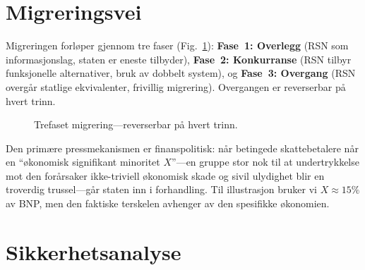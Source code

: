 \documentclass[11pt,a4paper,twocolumn]{article}
\begin{document}
\section{Migreringsvei}

Migreringen forløper gjennom tre faser (Fig.~\ref{fig:migration}): \textbf{Fase~1: Overlegg} (RSN som informasjonslag, staten er eneste tilbyder), \textbf{Fase~2: Konkurranse} (RSN tilbyr funksjonelle alternativer, bruk av dobbelt system), og \textbf{Fase~3: Overgang} (RSN overgår statlige ekvivalenter, frivillig migrering). Overgangen er reverserbar på hvert trinn.

\begin{figure}[ht]
\centering
{}
\caption{Trefaset migrering---reverserbar på hvert trinn.}
\label{fig:migration}
\end{figure}

Den primære pressmekanismen er finanspolitisk: når betingede skattebetalere når en ``økonomisk signifikant minoritet $X$''---en gruppe stor nok til at undertrykkelse mot den forårsaker ikke-triviell økonomisk skade og sivil ulydighet blir en troverdig trussel---går staten inn i forhandling. Til illustrasjon bruker vi $X \approx 15\%$ av BNP, men den faktiske terskelen avhenger av den spesifikke økonomien.

\section{Sikkerhetsanalyse}
\end{document}
